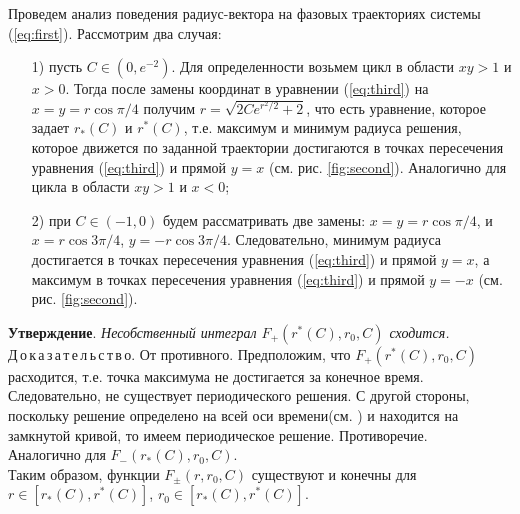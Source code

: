 Проведем анализ поведения радиус-вектора на фазовых траекториях системы (\ref{eq:first}). Рассмотрим два случая:
\begin{enumerate}
    \item [{1)}] пусть $C\in(0, e^{-2})$. Для определенности возьмем цикл в области $xy > 1$ и $x > 0$. Тогда после замены координат в уравнении (\ref{eq:third}) на $x = y = r\cos{\pi/4}$ получим $r = \sqrt{2C e^{r^2/2} + 2}$, что есть уравнение, которое задает $r_*(C)$ и $r^*(C)$, т.е. максимум и минимум радиуса решения, которое движется по заданной траектории достигаются в точках пересечения уравнения (\ref{eq:third}) и прямой $y = x$ (см. рис. \ref{fig:second}). Аналогично для цикла в области $xy > 1$ и $x < 0$;
    \item [{2)}] при $C\in(-1, 0)$ будем рассматривать две замены: $x = y = r\cos{\pi/4}$, и $x = r\cos{3\pi/4}$, $y = -r\cos{3\pi/4}$. Следовательно, минимум радиуса достигается в точках пересечения уравнения (\ref{eq:third}) и прямой $y = x$, а максимум в точках пересечения уравнения (\ref{eq:third}) и прямой $y = -x$ (см. рис. \ref{fig:second}). 
\end{enumerate}

\textbf{Утверждение}.\textit{ Несобственный интеграл $F_+(r^*(C), r_0,C)$ сходится.}\\ 
Д\,о\,к\,а\,з\,а\,т\,е\,л\,ь\,с\,т\,в\,о. От противного. Предположим, что $F_+(r^*(C), r_0, C)$ расходится, т.е. точка максимума не достигается за конечное время. Следовательно, не существует периодического решения. С другой стороны, поскольку решение определено на всей оси времени(см. \cite{basov}) и находится на замкнутой кривой, то имеем периодическое решение. Противоречие.\\
Аналогично для $F_-(r_*(C), r_0, C)$.\\

Таким образом, функции $F_\pm(r,r_0, C)$ существуют и конечны для $r \in [r_*(C), r^*(C)]$, $r_0 \in [r_*(C), r^*(C)]$.

